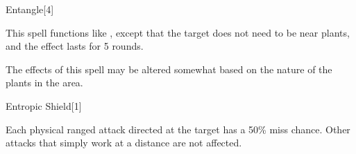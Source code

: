 \begin{spellsection}[Greater]{Entangle}[4]
    \begin{spellheader}
    \end{spellheader}
    \begin{spellcontent}
        \begin{spelltargetinginfo}
        \end{spelltargetinginfo}
        \begin{spelleffects}
            \spellspecial This spell functions like , except that the target does not need to be near plants, and the effect lasts for 5 rounds.
        \end{spelleffects}
    \end{spellcontent}
    \begin{spellfooter}
        \spellnotes The effects of this spell may be altered somewhat based on the nature of the plants in the area.
        \miscastrandom
    \end{spellfooter}
\end{spellsection}

\begin{spellsection}{Entropic Shield}[1]
    \begin{spellheader}
    \end{spellheader}
    \begin{spellcontent}
        \begin{spelltargetinginfo}
        \end{spelltargetinginfo}
        \begin{spelleffects}
            \spelleffect Each physical ranged attack directed at the target has a 50\% miss chance. Other attacks that simply work at a distance are not affected.
            \spelldur \durshort \dismissable
        \end{spelleffects}
    \end{spellcontent}
    \begin{spellfooter}
        \miscastrandom
    \end{spellfooter}
\end{spellsection}

